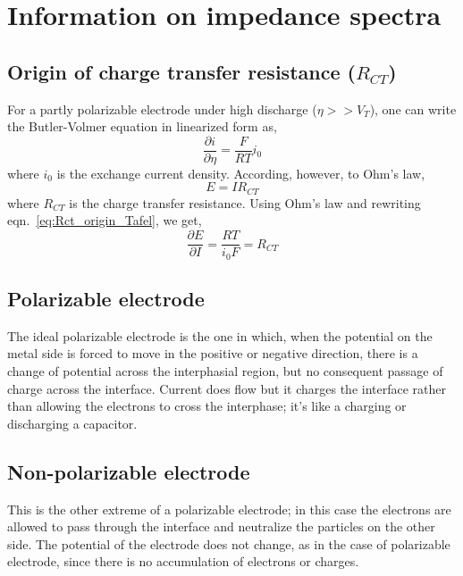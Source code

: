 \documentclass[12pt]{book}
\begin{document}
\section{Information on impedance spectra}
\subsection{Origin of charge transfer resistance ($R_{CT}$)}
For a partly polarizable electrode under high discharge ($\eta>> V_T$), one can write the Butler-Volmer equation in linearized form as,
\begin{equation}
\frac{\partial i}{\partial\eta} = \frac{F}{RT}i_0\label{eq:Rct_origin_Tafel}
\end{equation}
where $i_0$ is the exchange current density. According, however, to Ohm's law,
\begin{equation}
E = IR_{CT}
\end{equation}
where $R_{CT}$ is the charge transfer resistance. Using Ohm's law and rewriting eqn.~\ref{eq:Rct_origin_Tafel}, we get,
\begin{equation}
\frac{\partial E}{\partial I} = \frac{RT}{i_0F} = R_{CT}
\end{equation}


\subsection{Polarizable electrode}
The ideal polarizable electrode is the one in which, when the potential on the metal side is forced to move in the positive or negative direction, there is a change of potential across the interphasial region, but no consequent passage of charge across the interface. Current does flow but it charges the interface rather than allowing the electrons to cross the interphase; it's like a charging or discharging a capacitor. 

\subsection{Non-polarizable electrode}
This is the other extreme of a polarizable electrode; in this case the electrons are allowed to pass through the interface and neutralize the particles on the other side. The potential of the electrode does not change, as in the case of polarizable electrode, since there is no accumulation of electrons or charges.
 
\end{document}
